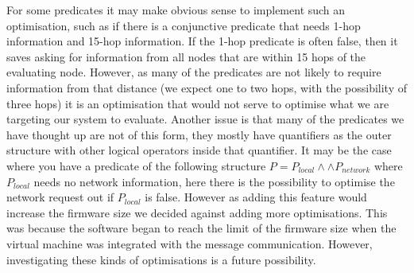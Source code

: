
For some predicates it may make obvious sense to implement such an optimisation, such as if there is a conjunctive predicate that needs 1-hop information and 15-hop information. If the 1-hop predicate is often false, then it saves asking for information from all nodes that are within 15 hops of the evaluating node. However, as many of the predicates are not likely to require information from that distance (we expect one to two hops, with the possibility of three hops) it is an optimisation that would not serve to optimise what we are targeting our system to evaluate. Another issue is that many of the predicates we have thought up are not of this form, they mostly have quantifiers as the outer structure with other logical operators inside that quantifier. It may be the case where you have a predicate of the following structure $P = P_{local} \land \land P_{network}$ where $P_{local}$ needs no network information, here there is the possibility to optimise the network request out if $P_{local}$ is false. However as adding this feature would increase the firmware size we decided against adding more optimisations. This was because the software began to reach the limit of the firmware size when the virtual machine was integrated with the message communication. However, investigating these kinds of optimisations is a future possibility.

